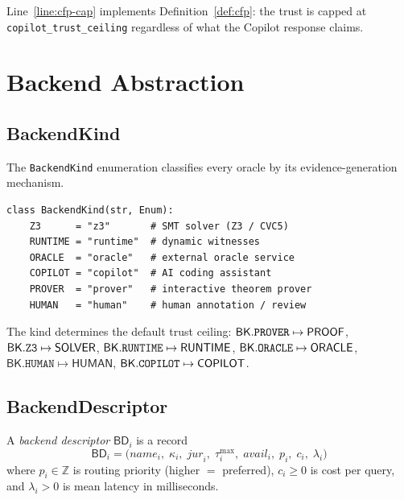 \documentclass[11pt]{article}
\newcommand{\BD}{\mathsf{BD}}               %
\newcommand{\BK}{\mathsf{BK}}               %
\begin{document}
Line~\ref{line:cfp-cap} implements Definition~\ref{def:cfp}: the trust
is capped at \texttt{copilot\_trust\_ceiling} regardless of what the
Copilot response claims.

\section{Backend Abstraction}\label{sec:backend}

\subsection{BackendKind}

The \texttt{BackendKind} enumeration classifies every oracle by its
evidence-generation mechanism.

\begin{lstlisting}[style=jugeo-python, caption={%
  \texttt{BackendKind} (from \texttt{src/jugeo/solver/router.py}).}]
class BackendKind(str, Enum):
    Z3      = "z3"       # SMT solver (Z3 / CVC5)
    RUNTIME = "runtime"  # dynamic witnesses
    ORACLE  = "oracle"   # external oracle service
    COPILOT = "copilot"  # AI coding assistant
    PROVER  = "prover"   # interactive theorem prover
    HUMAN   = "human"    # human annotation / review
\end{lstlisting}

The kind determines the default trust ceiling: $\BK.\texttt{PROVER}
\mapsto \Tproof$, $\BK.\texttt{Z3} \mapsto \Tsolver$,
$\BK.\texttt{RUNTIME} \mapsto \Truntime$,
$\BK.\texttt{ORACLE} \mapsto \Toracle$,
$\BK.\texttt{HUMAN} \mapsto \mathsf{HUMAN}$,
$\BK.\texttt{COPILOT} \mapsto \Tcopilot$.

\subsection{BackendDescriptor}

\begin{definition}\label{def:bd}
  A \emph{backend descriptor} $\BD_i$ is a record
  \[
    \BD_i = \bigl(\mathit{name}_i,\; \kappa_i,\; \mathit{jur}_i,\;
            \tau_i^{\max},\; \mathit{avail}_i,\; p_i,\; c_i,\;
            \lambda_i\bigr)
  \]
  where $p_i \in \mathbb{Z}$ is routing priority (higher $=$ preferred),
  $c_i \geq 0$ is cost per query, and $\lambda_i > 0$ is mean latency in
  milliseconds.
\end{definition}
\end{document}
